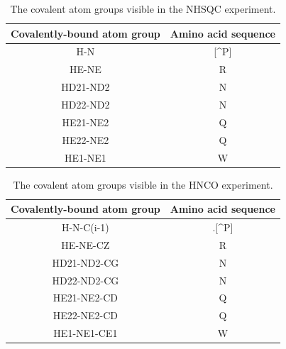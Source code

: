 \begin{table}
  \begin{tabular}{ | c | c | }
    \hline
    Covalently-bound atom group  &  Amino acid sequence  \\  \hline
    H-N                          &  [\^{}P]              \\  \hline
    HE-NE                        &  R                    \\  \hline
    HD21-ND2                     &  N                    \\  \hline
    HD22-ND2                     &  N                    \\  \hline
    HE21-NE2                     &  Q                    \\  \hline
    HE22-NE2                     &  Q                    \\  \hline
    HE1-NE1                      &  W                    \\  \hline
  \end{tabular}
  \caption{The covalent atom groups visible in the NHSQC experiment.}
  \label{nhsqc_peaktypes}
\end{table}

\begin{table}
  \begin{tabular}{ | c | c | }
    \hline
    Covalently-bound atom group  &  Amino acid sequence  \\  \hline
    H-N-C(i-1)                   &  .[\^{}P]             \\  \hline
    HE-NE-CZ                     &  R                    \\  \hline
    HD21-ND2-CG                  &  N                    \\  \hline
    HD22-ND2-CG                  &  N                    \\  \hline
    HE21-NE2-CD                  &  Q                    \\  \hline
    HE22-NE2-CD                  &  Q                    \\  \hline
    HE1-NE1-CE1                  &  W                    \\  \hline
  \end{tabular}
  \caption{The covalent atom groups visible in the HNCO experiment.}
  \label{hnco_peaktypes}
\end{table}
    
